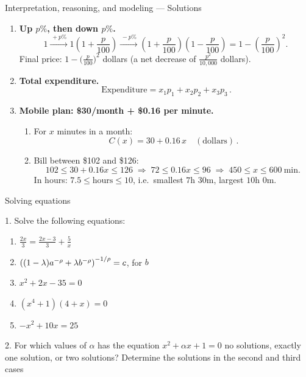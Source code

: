 \documentclass[9pt]{beamer}
\begin{document}
\begin{frame}{Interpretation, reasoning, and modeling — Solutions}

\begin{enumerate}[leftmargin=0.5cm, label=\arabic*., rightmargin=0.2cm]

  \item \textbf{Up $p\%$, then down $p\%$.}
  \[
  1 \xrightarrow{\,+p\%\,} 1\!\left(1+\frac{p}{100}\right)
    \xrightarrow{\,-p\%\,} \left(1+\frac{p}{100}\right)\!\left(1-\frac{p}{100}\right)
    = 1-\left(\frac{p}{100}\right)^2.
  \]
  Final price: \(\boxed{1-\bigl(\tfrac{p}{100}\bigr)^2}\) dollars (a net decrease of \( \tfrac{p^2}{10{,}000}\) dollars).

  \item \textbf{Total expenditure.}
  \[
    \boxed{\,\text{Expenditure}=x_1p_1+x_2p_2+x_3p_3\,}.
  \]

  \item \textbf{Mobile plan: \$30/month + \$0.16 per minute.}
  \begin{enumerate}[leftmargin=0.5cm, label=(\alph*), rightmargin=0.2cm]
    \item For \(x\) minutes in a month:
      \[
        \boxed{\,C(x)=30+0.16\,x\quad (\text{dollars})\,}.
      \]
    \item Bill between \$102 and \$126:
      \[
        102 \le 30+0.16x \le 126
        \;\Longrightarrow\;
        72 \le 0.16x \le 96
        \;\Longrightarrow\;
        450 \le x \le 600\ \text{min}.
      \]
      In hours: \(\boxed{7.5 \le \text{hours} \le 10}\), i.e.\ smallest \(7\text{h }30\text{m}\), largest \(10\text{h }0\text{m}\).
  \end{enumerate}

\end{enumerate}
\end{frame}


\begin{frame}{Solving equations}

    1. Solve the following equations:
    
    \begin{enumerate}[leftmargin = 0.8cm, label = (\alph*), rightmargin = 0.2cm]

    \item $\frac{2x}{3} = \frac{2x - 3}{3} + \frac{5}{x}$
    
    \item $\left((1-\lambda)a^{-\rho} + \lambda b^{-\rho}\right)^{-1/\rho} = c$, for $b$

    \item $x^2 + 2x - 35 = 0$

    \item $(x^4 + 1)(4 + x) = 0$

    \item $-x^2 + 10x = 25$
    
    \end{enumerate}

    2. For which values of $\alpha$ has the equation $x^2 + \alpha x + 1 = 0$ no solutions, exactly one solution, or two solutions? Determine the solutions in the second and third cases
    
\end{frame}
\end{document}
